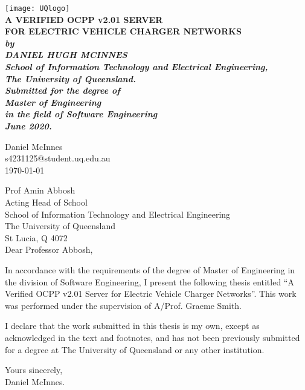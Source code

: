 \documentclass[12pt,openany,a4paper]{book}
\renewcommand{\baselinestretch}{1.2}	%
\begin{document}
\frontmatter

\begin{titlepage}
\renewcommand{\baselinestretch}{1.0}
\begin{center}
\texttt{[image: UQlogo]}\\
\vspace*{35mm}
\Huge\bf
		A VERIFIED OCPP v2.01 SERVER\\
		FOR ELECTRIC VEHICLE CHARGER NETWORKS\\
\vspace{20mm}
\large\sl
		by\\
		DANIEL HUGH MCINNES
		\medskip\\
\rm
		School of Information Technology and Electrical Engineering,\\
		The University of Queensland.\\
\vspace{30mm}
		Submitted for the degree of\\
		Master of Engineering
		\smallskip\\
\normalsize
		in the field of Software Engineering
		\medskip\\
\large
		June 2020.		
\end{center}
\end{titlepage}

\cleardoublepage

\begin{flushright}
	Daniel McInnes\\
	s4231125@student.uq.edu.au\\
	\medskip
	\today
\end{flushright}
\begin{flushleft}
  Prof Amin Abbosh\\
  Acting Head of School\\
  School of Information Technology and Electrical Engineering\\
  The University of Queensland\\
  St Lucia, Q 4072\\
  \bigskip\bigskip
  Dear Professor Abbosh,

\medskip
In accordance with the requirements of the degree of Master of
Engineering in the division of 
Software Engineering,
I present the
following thesis entitled ``A Verified OCPP v2.01 Server for Electric Vehicle Charger Networks''.  This work was performed under the supervision of A/Prof. Graeme Smith.
\medskip

I declare that the work submitted in this thesis is my own, except as
acknowledged in the text and footnotes, and has not been previously
submitted for a degree at The University of Queensland or any other
institution.

	Yours sincerely,\\
	\medskip
	\medskip
	Daniel McInnes.
\end{flushleft}
\end{document}
